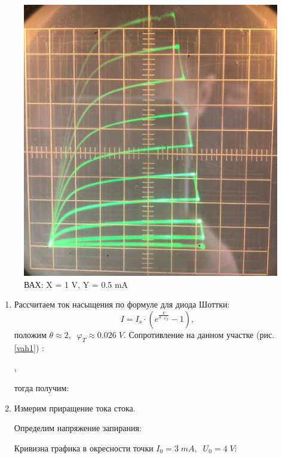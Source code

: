 \documentclass[a4paper]{article}
\begin{document}
\begin{figure}[h]
\begin{center}
\begin{minipage}[h]{0.4\linewidth}
        \includegraphics[width=1\linewidth]{vah2.jpg}
        \caption{ВАХ: X = 1 V, Y = 0.5 mA}
        \label{vah2}
    \end{minipage}
    \end{center}
\end{figure}

\begin{enumerate}
    \item Рассчитаем ток насыщения по формуле для диода Шоттки:
    $$I = I_s \cdot \left( e^{\frac{V}{\theta \cdot \varphi_T}} - 1 \right),$$
    положим $\theta \approx 2, \;\; \varphi_T \approx 0.026 \; V$.
    Сопротивление на данном участке (рис. \ref{vah1}) :

    \begin{center}
    ,
    \end{center}
    тогда получим:
    \begin{center}
    \end{center}

    \item Измерим приращение тока стока. \par
    Определим напряжение запирания: 

    \begin{center}
    \end{center}
    Кривизна графика в окресности точки $I_0 = 3 \; mA,\;\; U_0 = 4\; V:$
    \begin{center}
    \end{center}

\end{enumerate}



	
\end{document}
